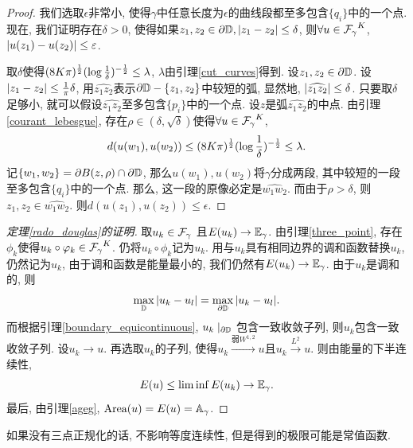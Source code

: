\begin{proof}
    我们选取$\epsilon$非常小, 使得$\gamma$中任意长度为$\epsilon$的曲线段都至多包含$\{q_i\}$中的一个点. 现在, 我们证明存在$\delta>0$, 使得如果$z_1,z_2 \in {\partial} {\mathbb{D}}, {\left | z_1-z_2 \right |} \le \delta$, 则$\forall u \in {\mathcal{F}_\gamma}^K$, ${\left | u(z_1)-u(z_2) \right |} \le \varepsilon$.  
    \par 取$\delta$使得$(8K\pi)^{{{\frac{1}{2}}}}(\log {{\frac{1}{\delta}}})^{-{{\frac{1}{2}}}} \le \lambda$, $\lambda$由引理\eqref{cut_curves}得到.  设$z_1,z_2 \in {\partial} {\mathbb{D}}$.  设${\left | z_1-z_2 \right |} \le {{\frac{1}{\pi}}} \delta$, 用$\widehat{z_1z_2}$表示${\partial} {\mathbb{D}} - \{z_1,z_2\}$中较短的弧, 显然地, ${\left | \widehat{z_1z_2} \right |} \le \delta$. 只要取$\delta$足够小, 就可以假设$\widehat{z_1z_2}$至多包含$\{p_i\}$中的一个点. 设$z$是弧$\widehat{z_1z_2}$的中点. 由引理\eqref{courant_lebesgue}, 存在$\rho \in (\delta, \sqrt{\delta})$使得$\forall u \in {\mathcal{F}_\gamma}^K$, 
    \begin{equation}
        d(u(w_1),u(w_2)) \le (8K\pi)^{{{\frac{1}{2}}}}(\log {{\frac{1}{\delta}}})^{-{{\frac{1}{2}}}} \le \lambda.
    \end{equation}
    记$\{w_1,w_2\} = {\partial} B(z,\rho) \cap {\partial} {\mathbb{D}}$, 那么$u(w_1), u(w_2)$将$\gamma$分成两段, 其中较短的一段至多包含$\{q_i\}$中的一个点. 那么, 这一段的原像必定是$\widehat{w_1w_2}$.  而由于$\rho > \delta$, 则$z_1,z_2 \in \widehat{w_1w_2}$. 则$d(u(z_1),u(z_2)) \le \epsilon$.
\end{proof}
\begin{proof}[定理\eqref{rado_douglas}的证明]
    取$u_k \in {\mathcal{F}_\gamma}$ 且$E(u_k) \to {\mathbb{E}_\gamma}$. 由引理\eqref{three_point}, 存在$\phi_k$使得$u_k\circ {\varphi}_k \in {\mathcal{F}_\gamma}^K$. 仍将$u_k\circ \phi_k$记为$u_k$.  用与$u_k$具有相同边界的调和函数替换$u_k$, 仍然记为$u_k$, 由于调和函数是能量最小的, 我们仍然有$E(u_k) \to {\mathbb{E}_\gamma}$.  由于$u_k$是调和的, 则
    \begin{equation}
        \max_{{\mathbb{D}}}{\left | u_k - u_l \right |} = \max_{{\partial} {\mathbb{D}}} {\left | u_k-u_l \right |}.
    \end{equation}
    而根据引理\eqref{boundary_equicontinuous}, $u_k\mid_{{\partial} {\mathbb{D}}}$ 包含一致收敛子列, 则$u_k$包含一致收敛子列. 设$u_k \to u$.  再选取$u_k$的子列, 使得$u_k \overset{\text{弱}W^{1,2}}{\longrightarrow} u$且$u_k \overset{L^2}{\longrightarrow} u$. 则由能量的下半连续性, 
    \begin{equation}
        E(u) \le \liminf E(u_k) \to {\mathbb{E}_\gamma}.
    \end{equation}
    最后, 由引理\eqref{ageg}, $\text{Area}(u)=E(u)={\mathbb{A}_\gamma}$.
\end{proof}
\ifcomment
    \begin{remark}
        如果没有三点正规化的话, 不影响等度连续性, 但是得到的极限可能是常值函数.
    \end{remark}
\fi
